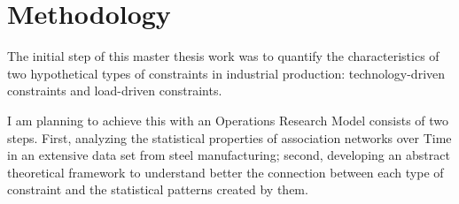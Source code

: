 \chapter{Methodology}
{\color{red} 
	
	The initial step of this master thesis work was to quantify the characteristics of two hypothetical types of constraints in industrial production: technology-driven constraints and load-driven constraints. 
	
	I am planning to achieve this with an Operations Research Model consists of two steps. First, analyzing the statistical properties of association networks over Time in an extensive data set from steel manufacturing; second, developing an abstract theoretical framework to understand better the connection between each type of constraint and the statistical patterns created by them. 
	
}

\clearpage
